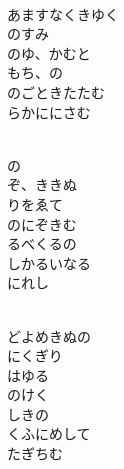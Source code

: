 \documentclass[10pt,b5j]{tarticle} %
\begin{document}
\vspace{1.5em} %
\newcommand{\linespace}{0.5em} %
\newcommand{\blocksize}{0.5\hsize} %
\newcommand{\itemmargin}{6em} %
\begin{enumerate} %
    \setlength{\itemindent}{\itemmargin} %
    \begin{minipage}[c]{\blocksize}
    
        \vspace{\linespace}
        \item~\\
        あますなくきゆく\\
        のすみ\\
        のゆ、かむと\\
        もち、の\\
        のごときたたむ\\
        らかににさむ
        
        \vspace{\linespace}
        \item~\\
        の\\
        ぞ、ききぬ\\
        りをゑて\\
        のにぞきむ\\
        るべくるの\\
        しかるいなる\\
        にれし
        
        \vspace{\linespace}
        \item~\\
        どよめきぬの\\
        にくぎり\\
        はゆる\\
        のけく\\
        しきの\\
        くふにめして\\
        たぎちむ
        

\end{minipage}
\end{enumerate}
\end{document}
